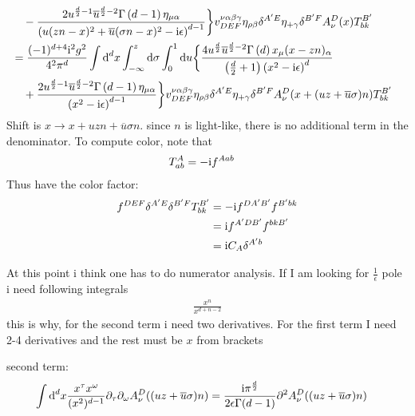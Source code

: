 \begin{align}
	\\&~~~
	- \frac{2u^{\frac{d}{2}-1} \overline u ^{\frac{d}{2}-2}\Gamma\left(d-1\right) \eta_{\mu \alpha}}{\left(u(zn-x)^2+\overline u (\sigma n-x)^2-\text{i} \epsilon\right)^{d-1}}\bigg\} 
	v^{\nu \alpha\beta\gamma}_{DEF}\eta_{\rho \beta} \delta^{A'E}\eta_{+ \gamma}\delta^{B'F}A_\nu^D(x)T_{bk}^{B'}
	\\
	&=
	\frac{(-1)^{d+4} \text{i} ^2 g^2}{4^2\pi^d} \int \text{d} ^d x \int _{-\infty}^{z} \text{d} \sigma \int_0^1 \text{d} u \bigg\{ \frac{4   u^{\frac{d}{2}} \overline u^{\frac{d}{2}-2} \Gamma\left(d\right)x_\mu(x-zn)_\alpha}{\left(\frac{d}{2}+1\right)\left(x^2-\text{i} \epsilon\right)^{d} } 
	\\&~~~
	+ \frac{2u^{\frac{d}{2}-1} \overline u ^{\frac{d}{2}-2}\Gamma\left(d-1\right) \eta_{\mu \alpha}}{\left(x^2-\text{i} \epsilon\right)^{d-1}}\bigg\} 
	v^{\nu \alpha\beta\gamma}_{DEF}\eta_{\rho \beta} \delta^{A'E}\eta_{+ \gamma}\delta^{B'F}A_\nu^D(x+(uz+\overline u \sigma)n)T_{bk}^{B'}
\end{align}
Shift is $x\rightarrow x + uzn + \overline u \sigma n$.
since $n$ is light-like, there is no additional term in the denominator. 
To compute color, note that 
\begin{align}
	T^{A}_{ab}
	&=
	-\text{i} f^{Aab}
\end{align}
Thus have the color factor:
\begin{align}
	f^{DEF}\delta^{A'E}\delta^{B'F}T_{bk}^{B'}
	&=
	-\text{i} f^{DA'B'} f^{B'bk} 
	\\
	&=
	\text{i} f^{A'DB'} f^{bkB'}
	\\
	&=
	\text{i} C_A \delta^{A'b}
\end{align}

At this point i think one has to do numerator analysis. 
If I am looking for $\frac{1}{\epsilon}$ pole i need following integrals
\begin{align}
	\frac{x^n}{x^{d+n-2}}
\end{align}
this is why, for the second term i need two derivatives. For the first term I need 2-4 derivatives and the rest must be $x$ from brackets

second term: 
\begin{align}
	\int \text{d} ^d x \frac{x^\tau x^\omega}{(x^2)^{d-1}} \partial_\tau \partial_\omega A_\nu^D((uz+\overline u\sigma)n)
	&=
	\frac{\text{i} \pi^{\frac{d}{2}}}{2 \epsilon \Gamma(d-1)} \partial^2 A_\nu ^D((uz+\overline u\sigma)n)
\end{align}


